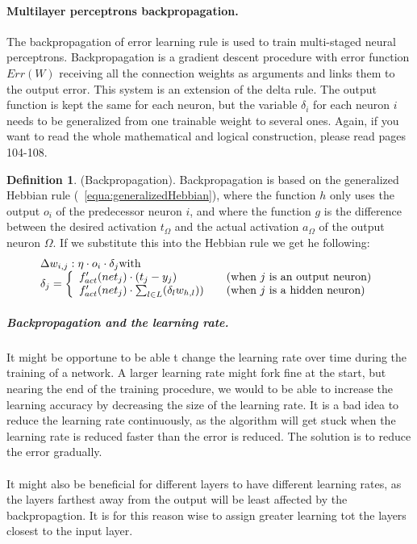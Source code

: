 \documentclass[pdftex,a4paper,12pt,twoside]{report}
\theoremstyle{plain} \newtheorem{theorem}{Theorem} \newtheorem{proposition}{Proposition} \newtheorem{lemma}{Lemma} \newtheorem*{corollary}{Corollary}
\theoremstyle{definition} \newtheorem{definition}{Definition} \newtheorem{conjecture}{Conjecture} \newtheorem*{example}{Example} \newtheorem{algorithm}{Algorithm}
\theoremstyle{remark} \newtheorem*{remark}{Remark} \newtheorem*{note}{Note} \newtheorem{case}{Case}
\begin{document}
\paragraph{Multilayer perceptrons backpropagation.}
The backpropagation of error learning rule is used to train multi-staged neural perceptrons. Backpropagation is a gradient descent procedure with error function $Err(W)$ receiving all the connection weights as arguments and links them to the output error. This system is an extension of the delta rule. The output function is kept the same for each neuron, but the variable $\delta_i$ for each neuron $i$ needs to be generalized from one trainable weight to several ones. Again, if you want to read the whole mathematical and logical construction, please read \citep{Kriesel2013} pages 104-108.
\begin{definition}
(Backpropagation). Backpropagation is based on the generalized Hebbian rule (~\ref{equa:generalizedHebbian}), where the function $h$ only uses the output $o_i$ of the predecessor neuron $i$, and where the function $g$ is the difference between the desired activation $t_\Omega$ and the actual activation $a_\Omega$ of the output neuron $\Omega$. If we substitute this into the Hebbian rule we get he following:
\begin{equation}
\begin{array}{l l}
\Delta w_{i,j} : \eta \cdot o_i \cdot \delta_j \text{with}\\
\delta_j = \left\{
	\begin{array}{l l}
    f'_{act}(net_j) \cdot (t_j - y_j) & \quad \text{(when $j$ is an output neuron)}\\
    f'_{act}(net_j) \cdot \sum_{l \in L}(\delta_lw_{h,l})) & \quad \text{(when $j$ is a hidden neuron)}
  \end{array} \right.
\end{array}
\end{equation}
\end{definition}
\subparagraph{Backpropagation and the learning rate.}
It might be opportune to be able t change the learning rate over time during the training of a network. A larger learning rate might fork fine at the start, but nearing the end of the training procedure, we would to be able to increase the learning accuracy by decreasing the size of the learning rate. It is a bad idea to reduce the learning rate continuously, as the algorithm will get stuck when the learning rate is reduced faster than the error is reduced. The solution is to reduce the error gradually.\\\\It might also be beneficial for different layers to have different learning rates, as the layers farthest away from the output will be least affected by the backpropagtion. It is for this reason wise to assign greater learning tot the layers closest to the input layer.
\end{document}
